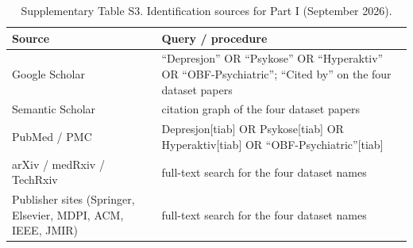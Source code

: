 \begin{table}[!htbp]\centering\caption{Supplementary Table S3. Identification sources for Part I (September 2026).}\footnotesize
\begin{tabular}{ll}\toprule Source & Query / procedure\\\midrule
Google Scholar & ``Depresjon'' OR ``Psykose'' OR ``Hyperaktiv'' OR ``OBF-Psychiatric''; ``Cited by'' on the four dataset papers\\
Semantic Scholar & citation graph of the four dataset papers\\
PubMed / PMC & Depresjon[tiab] OR Psykose[tiab] OR Hyperaktiv[tiab] OR ``OBF-Psychiatric''[tiab]\\
arXiv / medRxiv / TechRxiv & full-text search for the four dataset names\\
Publisher sites (Springer, Elsevier, MDPI, ACM, IEEE, JMIR) & full-text search for the four dataset names\\
\bottomrule\end{tabular}\end{table}

